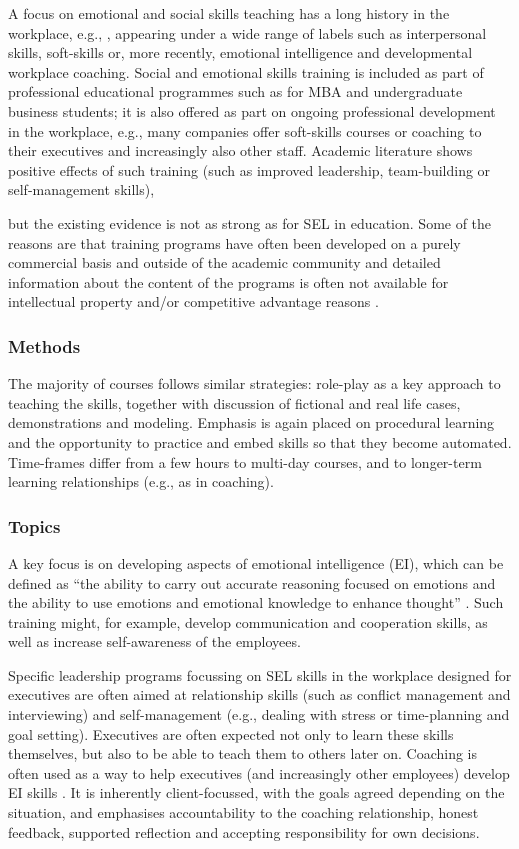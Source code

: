 \documentclass[prodmode,acmtochi]{acmsmall}
\newcommand{\GeraldineFIX}[1]{}
\begin{document}
A focus on emotional and social skills teaching has a long history in the workplace, e.g.,  \cite{Bailey1983,Bailey1983a}, appearing under a wide range of labels such as interpersonal skills, soft-skills or, more recently, emotional intelligence and developmental workplace coaching. Social and emotional skills training is included as part of professional educational programmes such as for MBA and undergraduate business students; it is also offered as part on ongoing professional development in the workplace, e.g., many companies offer soft-skills courses or coaching to their executives and increasingly also other staff. 
%
Academic literature shows positive effects of such training (such as improved leadership, team-building or self-management skills),
\GeraldineFIX{G: \textbf{(G:\ SUCH\ AS???)},} 
but the existing evidence is not as strong as for SEL in education. Some of the reasons are that training programs have often been developed on a purely commercial basis and outside of the academic community  and detailed information about the content of the programs is often not available for intellectual property and/or competitive advantage reasons \cite{Walter2011,Clarke2006,Riggio2003}. 




\subsubsection*{Methods} The majority of courses follows similar strategies: role-play as a key approach to teaching the skills, together with discussion of fictional and real life cases, demonstrations and modeling. Emphasis is again placed on procedural learning and the opportunity to practice and embed skills so that they become automated. Time-frames differ from a few hours to multi-day courses, and to longer-term learning relationships (e.g., as in coaching). 

\subsubsection*{Topics} 
        A key focus is on developing aspects of emotional intelligence (EI), which can be defined as ``the ability to carry out accurate reasoning focused on emotions and the ability to use emotions and emotional knowledge to enhance thought'' \cite{Mayer2008}. Such training might, for example, develop communication and cooperation skills, as well as increase self-awareness of the employees. 
        
        Specific leadership programs focussing on SEL skills in the workplace designed for executives are often aimed at relationship skills (such as conflict management and interviewing) and self-management (e.g., dealing with stress or time-planning and goal setting). Executives are often expected not only to learn these skills themselves, but also to be able to teach them to others later on. Coaching is often used as a way to help executives (and increasingly other employees) develop EI skills \cite{Bono2009}. It is inherently client-focussed, with the goals agreed depending on the situation, and emphasises accountability to the coaching relationship, honest feedback, supported reflection and accepting responsibility for own decisions. 
\end{document}
